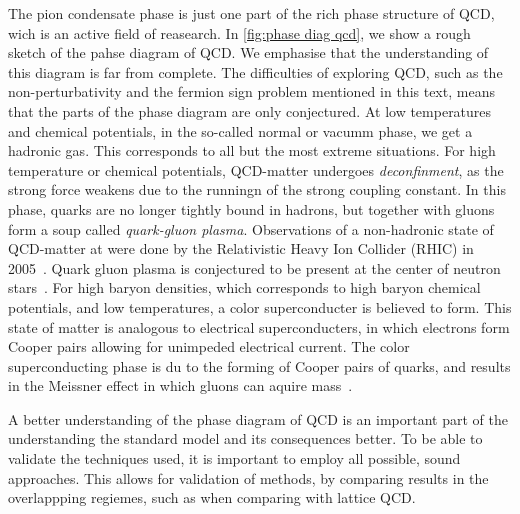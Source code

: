 The pion condensate phase is just one part of the rich phase structure of QCD, wich is an active field of reasearch.
In \autoref{fig:phase diag qcd}, we show a rough sketch of the pahse diagram of QCD.
We emphasise that the understanding of this diagram is far from complete.
The difficulties of exploring QCD, such as the non-perturbativity and the fermion sign problem mentioned in this text, means that the parts of the phase diagram are only conjectured.
At low temperatures and chemical potentials, in the so-called normal or vacumm phase, we get a hadronic gas.
This corresponds to all but the most extreme situations.
For high temperature or chemical potentials, QCD-matter undergoes \emph{deconfinment}, as the strong force weakens due to the runningn of the strong coupling constant.
In this phase, quarks are no longer tightly bound in hadrons, but together with gluons form a soup called \emph{quark-gluon plasma}.
Observations of a non-hadronic state of QCD-matter at were done by the Relativistic Heavy Ion Collider (RHIC) in 2005~\cite{2005:RHIC,2005:RHIC2}.
Quark gluon plasma is conjectured to be present at the center of neutron stars~\cite{from_hadrons_to_quarks}.
For high baryon densities, which corresponds to high baryon chemical potentials, and low temperatures, a color superconducter is believed to form.
This state of matter is analogous to electrical superconducters, in which electrons form Cooper pairs allowing for unimpeded electrical current.
The color superconducting phase is du to the forming of Cooper pairs of quarks, and results in the Meissner effect in which gluons can aquire mass~\cite{alford:color_superconductivity}.

A better understanding of the phase diagram of QCD is an important part of the understanding the standard model and its consequences better.
To be able to validate the techniques used, it is important to employ all possible, sound approaches.
This allows for validation of methods, by comparing results in the overlappping regiemes, such as when comparing \chpt with lattice QCD.


